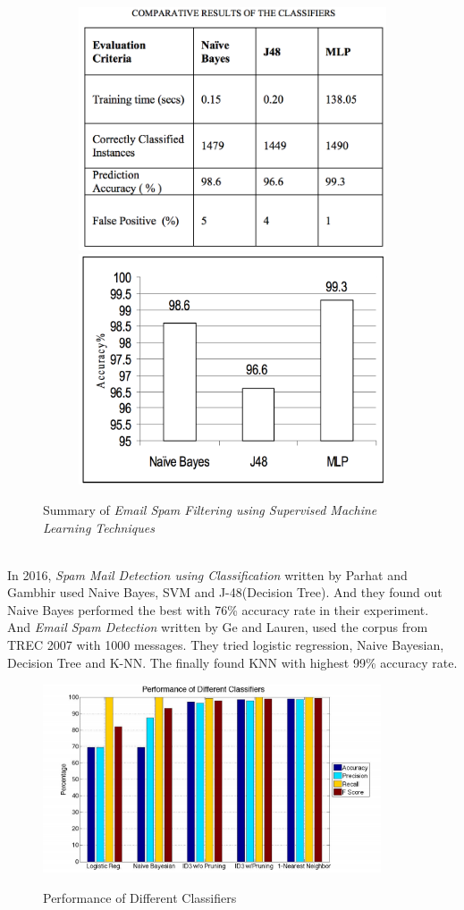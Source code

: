 \begin{figure}[H]
	\begin{subfigure}{\textwidth}
		\centering
		\includegraphics[width=.4\linewidth]{2010-1.png}
		\includegraphics[width=.4\linewidth]{2010-2.png}\\
	\end{subfigure}%
	\caption{Summary of \textit{Email Spam Filtering using Supervised Machine Learning Techniques}}
	\label{paper_summary_2010}
\end{figure}\\



In 2016, \textit{Spam Mail Detection using Classification} written by Parhat and Gambhir used Naive Bayes, SVM and J-48(Decision Tree). And they found out Naive Bayes performed the best with 76\% accuracy rate in their experiment. \\ And \textit{Email Spam Detection} written by Ge and  Lauren, used the corpus from TREC 2007 with 1000 messages. They tried logistic regression, Naive Bayesian, Decision Tree and K-NN. The finally found KNN with highest 99\% accuracy rate. \\

\begin{figure}[H]
	\centering
	\includegraphics[width=10cm]{2016.png}\\
	\caption{Performance of Different Classifiers}
	\label{paper_summary_2016}
\end{figure}\\



